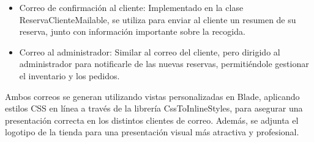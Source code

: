 \begin{itemize}
\begin{itemize}
     \begin{itemize}
         \item Correo de confirmación al cliente: Implementado en la clase ReservaClienteMailable, se utiliza para enviar al cliente un resumen de su reserva, junto con información importante sobre la recogida.

         \item Correo al administrador: Similar al correo del cliente, pero dirigido al administrador para notificarle de las nuevas reservas, permitiéndole gestionar el inventario y los pedidos.

    \end{itemize}

     Ambos correos se generan utilizando vistas personalizadas en Blade, aplicando estilos CSS en línea a través de la librería CssToInlineStyles, para asegurar una presentación correcta en los distintos clientes de correo. Además, se adjunta el logotipo de la tienda para una presentación visual más atractiva y profesional.
     
\end{itemize}

\end{itemize}

